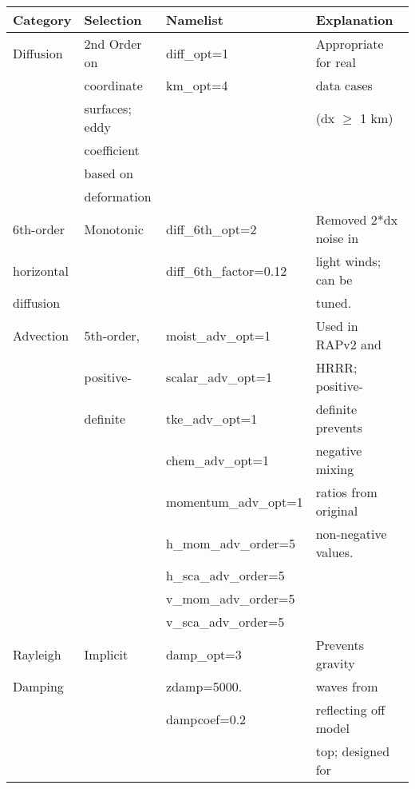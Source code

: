 \begin{tabular}{|l|l|l|l|} \hline
Category     & Selection     & Namelist           & Explanation          \\ \hline
Diffusion    & 2nd Order on  & diff\_opt=1        & Appropriate for real \\
             & coordinate    & km\_opt=4          & data cases           \\
             & surfaces; eddy&                    & (dx $\geq$ 1 km)     \\
             & coefficient   &                    & \\
             & based on      &                    & \\
             & deformation   &                    & \\ \hline
6th-order    & Monotonic     & diff\_6th\_opt=2   & Removed 2*dx noise in  \\
horizontal   &               & diff\_6th\_factor=0.12 & light winds; can be\\
diffusion    &               &                        & tuned. \\ \hline
Advection    & 5th-order,    & moist\_adv\_opt=1   & Used in RAPv2 and   \\
             & positive-     & scalar\_adv\_opt=1  & HRRR; positive-     \\
             & definite      & tke\_adv\_opt=1     & definite prevents   \\
             &               & chem\_adv\_opt=1    & negative mixing     \\
             &               & momentum\_adv\_opt=1& ratios from original\\
             &               & h\_mom\_adv\_order=5& non-negative values.\\
             &               & h\_sca\_adv\_order=5& \\
             &               & v\_mom\_adv\_order=5& \\
             &               & v\_sca\_adv\_order=5& \\ \hline
Rayleigh     & Implicit      & damp\_opt=3         & Prevents gravity    \\
Damping      &               & zdamp=5000.         & waves from          \\
             &               & dampcoef=0.2        & reflecting off model\\
             &               &                     & top; designed for   \\

\end{tabular}
